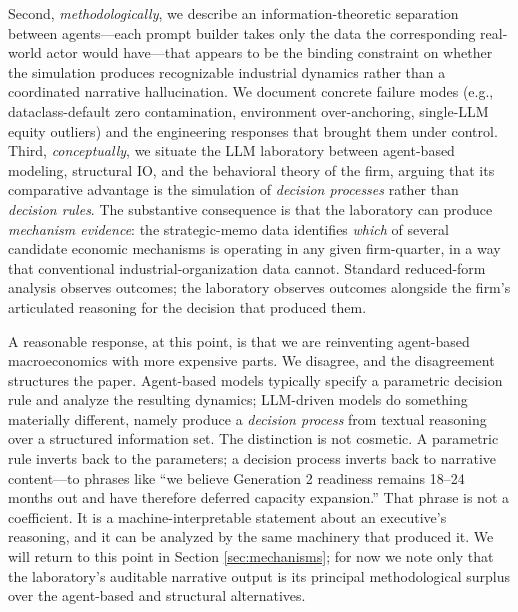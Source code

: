 \documentclass[11pt]{article}
\begin{document}
Second, \textit{methodologically}, we describe an
information-theoretic separation between agents---each prompt builder
takes only the data the corresponding real-world actor would have---that
appears to be the binding constraint on whether the simulation produces
recognizable industrial dynamics rather than a coordinated narrative
hallucination. We document concrete failure modes (e.g., dataclass-default
zero contamination, environment over-anchoring, single-LLM equity
outliers) and the engineering responses that brought them under control.
Third, \textit{conceptually}, we situate the LLM laboratory between
agent-based modeling, structural IO, and the behavioral theory of the
firm, arguing that its comparative advantage is the simulation of
\emph{decision processes} rather than \emph{decision rules}. The
substantive consequence is that the laboratory can produce
\emph{mechanism evidence}: the strategic-memo data identifies
\emph{which} of several candidate economic mechanisms is operating in
any given firm-quarter, in a way that conventional industrial-organization
data cannot. Standard reduced-form analysis observes outcomes; the
laboratory observes outcomes alongside the firm's articulated
reasoning for the decision that produced them.

A reasonable response, at this point, is that we are reinventing
agent-based macroeconomics with more expensive parts. We disagree, and
the disagreement structures the paper. Agent-based models typically
specify a parametric decision rule and analyze the resulting dynamics;
LLM-driven models do something materially different, namely produce a
\emph{decision process} from textual reasoning over a structured
information set. The distinction is not cosmetic. A parametric rule
inverts back to the parameters; a decision process inverts back to
narrative content---to phrases like ``we believe Generation 2 readiness
remains 18--24 months out and have therefore deferred capacity
expansion.'' That phrase is not a coefficient. It is a
machine-interpretable statement about an executive's reasoning, and it
can be analyzed by the same machinery that produced it. We will return
to this point in Section \ref{sec:mechanisms}; for now we note only that
the laboratory's auditable narrative output is its principal
methodological surplus over the agent-based and structural alternatives.
\end{document}
